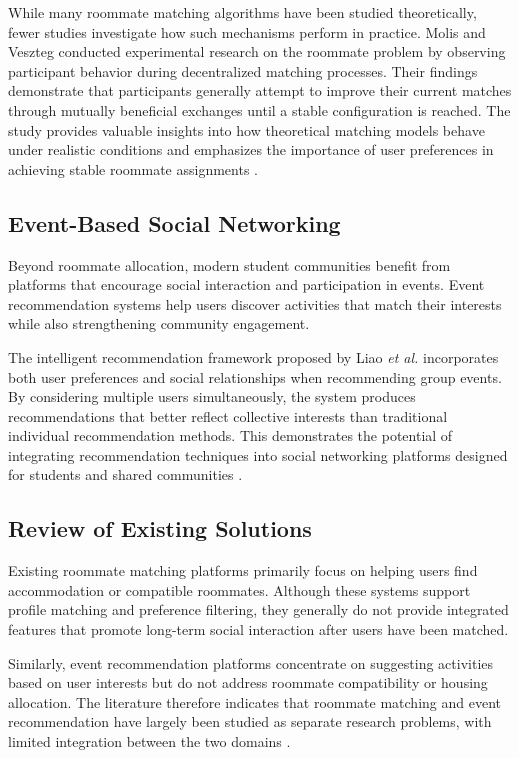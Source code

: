 While many roommate matching algorithms have been studied theoretically, fewer studies investigate how such mechanisms perform in practice. Molis and Veszteg conducted experimental research on the roommate problem by observing participant behavior during decentralized matching processes. Their findings demonstrate that participants generally attempt to improve their current matches through mutually beneficial exchanges until a stable configuration is reached. The study provides valuable insights into how theoretical matching models behave under realistic conditions and emphasizes the importance of user preferences in achieving stable roommate assignments \cite{molis2023}.

\subsection{Event-Based Social Networking}

Beyond roommate allocation, modern student communities benefit from platforms that encourage social interaction and participation in events. Event recommendation systems help users discover activities that match their interests while also strengthening community engagement.

The intelligent recommendation framework proposed by Liao \textit{et al.} incorporates both user preferences and social relationships when recommending group events. By considering multiple users simultaneously, the system produces recommendations that better reflect collective interests than traditional individual recommendation methods. This demonstrates the potential of integrating recommendation techniques into social networking platforms designed for students and shared communities \cite{liao2016}.

\subsection{Review of Existing Solutions}

Existing roommate matching platforms primarily focus on helping users find accommodation or compatible roommates. Although these systems support profile matching and preference filtering, they generally do not provide integrated features that promote long-term social interaction after users have been matched.

Similarly, event recommendation platforms concentrate on suggesting activities based on user interests but do not address roommate compatibility or housing allocation. The literature therefore indicates that roommate matching and event recommendation have largely been studied as separate research problems, with limited integration between the two domains \cite{hosseini2025,liao2016,molis2023}.

